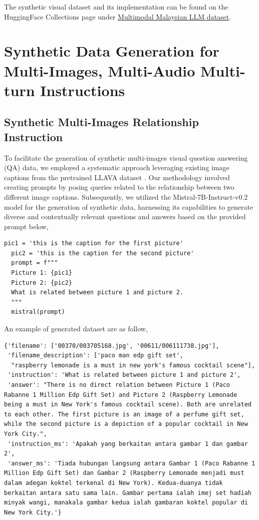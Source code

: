 \documentclass[preprint]{article}
\begin{document}
The synthetic visual dataset and its implementation can be found on the HuggingFace Collections page under \href{https://huggingface.co/collections/mesolitica/multimodal-malaysian-llm-dataset-653a16214037a1bc4417eb3a}{Multimodal Malaysian LLM dataset}.

\section{Synthetic Data Generation for Multi-Images, Multi-Audio Multi-turn Instructions}

\subsection{Synthetic Multi-Images Relationship Instruction}

To facilitate the generation of synthetic multi-images visual question answering (QA) data, we employed a systematic approach leveraging existing image captions from the pretrained LLAVA dataset \cite{liu2023visual}. Our methodology involved creating prompts by posing queries related to the relationship between two different image captions. Subsequently, we utilized the Mistral-7B-Instruct-v0.2 model \cite{jiang2023mistral} for the generation of synthetic data, harnessing its capabilities to generate diverse and contextually relevant questions and answers based on the provided prompt below,

\begin{lstlisting}[breaklines=true]
  pic1 = 'this is the caption for the first picture'
  pic2 = 'this is the caption for the second picture'
  prompt = f"""
  Picture 1: {pic1} 
  Picture 2: {pic2}
  What is related between picture 1 and picture 2.
  """
  mistral(prompt)
\end{lstlisting}

An example of generated dataset are as follow,

\begin{lstlisting}[breaklines=true]
  {'filename': ['00370/003705168.jpg', '00611/006111738.jpg'],
 'filename_description': ['paco man edp gift set',
  "raspberry lemonade is a must in new york's famous cocktail scene"],
 'instruction': 'What is related between picture 1 and picture 2',
 'answer': "There is no direct relation between Picture 1 (Paco Rabanne 1 Million Edp Gift Set) and Picture 2 (Raspberry Lemonade being a must in New York's famous cocktail scene). Both are unrelated to each other. The first picture is an image of a perfume gift set, while the second picture is a depiction of a popular cocktail in New York City.",
 'instruction_ms': 'Apakah yang berkaitan antara gambar 1 dan gambar 2',
 'answer_ms': 'Tiada hubungan langsung antara Gambar 1 (Paco Rabanne 1 Million Edp Gift Set) dan Gambar 2 (Raspberry Lemonade menjadi must dalam adegan koktel terkenal di New York). Kedua-duanya tidak berkaitan antara satu sama lain. Gambar pertama ialah imej set hadiah minyak wangi, manakala gambar kedua ialah gambaran koktel popular di New York City.'}
\end{lstlisting}
\end{document}
